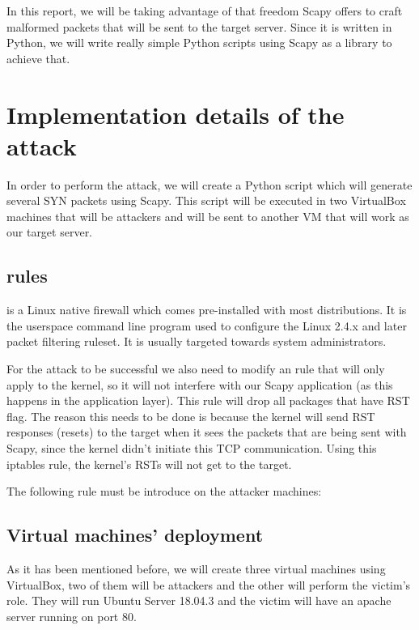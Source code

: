 \documentclass[11pt]{article}
\begin{document}
In this report, we will be taking advantage of that freedom Scapy offers to craft malformed packets that will be sent to the target server. Since it is written in Python, we will write really simple Python scripts using Scapy as a library to achieve that.
\clearpage

\section{Implementation details of the attack}
In order to perform the attack, we will create a Python script which will generate several SYN packets using Scapy. This script will be executed in two VirtualBox machines that will be attackers and will be sent to another VM that will work as our target server.\vspace{5mm}

\subsection{\textbf{\texttt{}} rules}
\texttt{} is a Linux native firewall which comes pre-installed with most distributions. It is the userspace command line program used to configure the Linux 2.4.x and later packet filtering ruleset. It is usually targeted towards system administrators.\vspace{5mm}

For the attack to be successful we also need to modify an \texttt{} rule that will only apply to the kernel, so it will not interfere with our Scapy application (as this happens in the application layer). This rule will drop all packages that have RST flag. The reason this needs to be done is because the kernel will send RST responses (resets) to the target when it sees the packets that are being sent with Scapy, since the kernel didn’t initiate this TCP communication. Using this iptables rule, the kernel’s RSTs will not get to the target.\vspace{5mm}

The following rule must be introduce on the attacker machines:\vspace{5mm}

\texttt{}\vspace{5mm}

\subsection{Virtual machines' deployment}
As it has been mentioned before, we will create three virtual machines using VirtualBox, two of them will be attackers and the other will perform the victim's role. They will run Ubuntu Server 18.04.3 and the victim will have an apache server running on port 80.\vspace{5mm}
\end{document}
